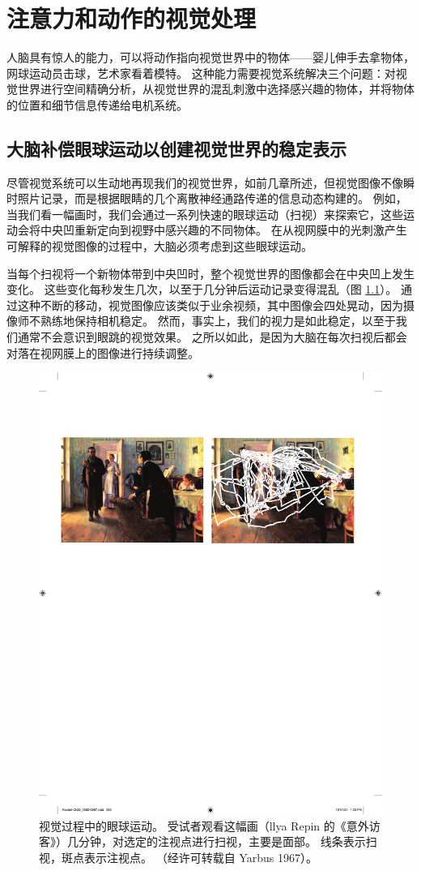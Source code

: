 \chapter{注意力和动作的视觉处理} \label{chap:chap25}
人脑具有惊人的能力，可以将动作指向视觉世界中的物体——婴儿伸手去拿物体，网球运动员击球，艺术家看着模特。 
这种能力需要视觉系统解决三个问题：对视觉世界进行空间精确分析，从视觉世界的混乱刺激中选择感兴趣的物体，并将物体的位置和细节信息传递给电机系统。

\section{大脑补偿眼球运动以创建视觉世界的稳定表示}
尽管视觉系统可以生动地再现我们的视觉世界，如前几章所述，但视觉图像不像瞬时照片记录，而是根据眼睛的几个离散神经通路传递的信息动态构建的。
例如，当我们看一幅画时，我们会通过一系列快速的眼球运动（扫视）来探索它，这些运动会将中央凹重新定向到视野中感兴趣的不同物体。
在从视网膜中的光刺激产生可解释的视觉图像的过程中，大脑必须考虑到这些眼球运动。


当每个扫视将一个新物体带到中央凹时，整个视觉世界的图像都会在中央凹上发生变化。
这些变化每秒发生几次，以至于几分钟后运动记录变得混乱（图 \ref{fig:25_1}）。 
通过这种不断的移动，视觉图像应该类似于业余视频，其中图像会四处晃动，因为摄像师不熟练地保持相机稳定。 
然而，事实上，我们的视力是如此稳定，以至于我们通常不会意识到眼跳的视觉效果。
之所以如此，是因为大脑在每次扫视后都会对落在视网膜上的图像进行持续调整。


\begin{figure}[htbp]
	\centering
	\includegraphics[width=0.65\linewidth]{chap25/fig_25_1}
	\caption{视觉过程中的眼球运动。 受试者观看这幅画（llya Repin 的《意外访客》）几分钟，对选定的注视点进行扫视，主要是面部。 线条表示扫视，斑点表示注视点。 （经许可转载自 Yarbus 1967）。}
	\label{fig:25_1}
\end{figure}

